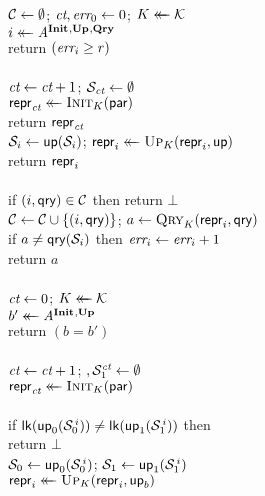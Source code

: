 \begin{figure}[t]
  {
    \\[2pt]
      $\setC \gets \emptyset$; $\ct,\err_0 \gets 0$;
      $\key \getsr \keys$\\
      $i \getsr \advA^{\INITO,\UPO,\QRYO}$\\
      return $(\err_i \geq r)$
    \\[6pt]
    \oraclev{$\INITO(\param)$}\\[2pt]
      $\ct\gets\ct+1$;
      $\col_\ct \gets \emptyset$\\
      $\pub_\ct \getsr \Init_\key(\param)$\\
      return $\pub_\ct$
  }
  {
    \\[2pt]
      $\col_i \gets \up(\col_i)$;
      $\pub_i \getsr \Up_\key(\pub_i, \up)$\\
      return $\pub_i$
    \\[9pt]
    \\[2pt]
      if $(i,\qry) \in \setC$ then return $\bot$\\
      $\setC \gets \setC \union \{(i,\qry)\}$; $a \gets \Qry_K(\pub_i, \qry)$\\
      if $a \ne \qry(\col_i)$ then $\err_i \gets \err_i + 1$\\
      return $a$
  }
  \\[2pt]
  {
    \\[2pt]
      $\ct \gets 0$;
      $\key \getsr \keys$\\
      $b' \getsr \advA^{\INITO,\UPO}$\\
      return $(b = b')$
    \\[6pt]
    \oraclev{$\INITO(\param)$}\\[2pt]
      $\ct\gets\ct+1$; $, \col^\ct_1 \gets \emptyset$\\
      $\pub_\ct \getsr \Init_\key(\param)$
    \\[6pt]
    \\[2pt]
      if $\lk(\up_0(\col^{\,i}_0)) \ne \lk(\up_1(\col^{\,i}_1))$ then\\
      \tab return $\bot$\\
      $\col_0 \gets \up_0(\col^{\,i}_0)$;
      $\col_1 \gets \up_1(\col^{\,i}_1)$\\
      $\pub_i \getsr \Up_\key(\pub_i, \up_b)$\\
}
\end{figure}
